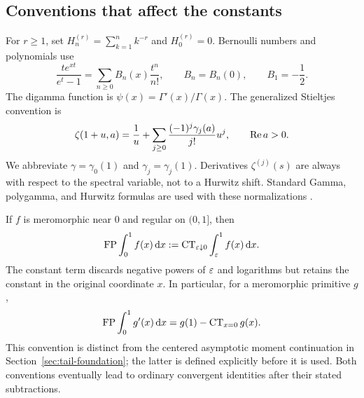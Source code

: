 \subsection{Conventions that affect the constants}

For $r\ge1$, set $H_n^{(r)}=\sum_{k=1}^n k^{-r}$ and
$H_0^{(r)}=0$. Bernoulli numbers and polynomials use
\[
 \frac{te^{xt}}{e^t-1}=\sum_{n\ge0}B_n(x)\frac{t^n}{n!},
 \qquad B_n=B_n(0),\qquad B_1=-\frac12.
\]
The digamma function is $\psi(x)=\Gamma'(x)/\Gamma(x)$.
The generalized Stieltjes convention is
\begin{equation}\label{eq:stieltjes-convention}
 \zeta(1+u,a)=\frac1u+
       \sum_{j\ge0}\frac{(-1)^j\gamma_j(a)}{j!}u^j,
 \qquad \operatorname{Re} a>0.
\end{equation}
We abbreviate $\gamma=\gamma_0(1)$ and
$\gamma_j=\gamma_j(1)$. Derivatives $\zeta^{(j)}(s)$ are always
with respect to the spectral variable, not to a Hurwitz shift.
Standard Gamma, polygamma, and Hurwitz formulas are used with these
normalizations \cite{DLMF}.

If $f$ is meromorphic near $0$ and regular on $(0,1]$, then
\begin{equation}\label{eq:fp-convention}
 \operatorname{FP}\int_0^1 f(x)\,\mathrm d x
 :=\operatorname{CT}_{\varepsilon\downarrow0}\int_{\varepsilon}^1 f(x)\,\mathrm d x.
\end{equation}
The constant term discards negative powers of $\varepsilon$ and logarithms
but retains the constant in the original coordinate $x$.
In particular, for a meromorphic primitive $g$,
\begin{equation}\label{eq:endpoint-law-intro}
 \operatorname{FP}\int_0^1 g'(x)\,\mathrm d x=g(1)-\operatorname{CT}_{x=0}g(x).
\end{equation}
This convention is distinct from the centered asymptotic moment
continuation in Section~\ref{sec:tail-foundation}; the latter is
defined explicitly before it is used. Both conventions eventually
lead to ordinary convergent identities after their stated subtractions.
